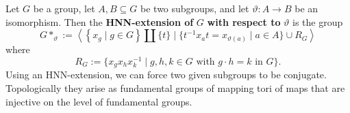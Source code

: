 \begin{definition}
    Let $G$ be a group, let $A,B \subseteq G$ be two subgroups, and let $\vartheta \colon A \to B$ be an isomorphism. Then the \textbf{HNN-extension of} $G$ \textbf{with respect to} $\vartheta$ is the group \[
        G * _{\vartheta} := \left\langle \left\{ x_g \mid g \in G \right\} \amalg \{t\} \mid  \{t ^{-1} x_a t = x _{\vartheta(a)}\mid a \in A\} \cup R_G  \right\rangle 
    \] where \[
    R_G := \{x_g x_h x_k ^{-1} \mid g,h ,k \in G \text{ with } g \cdot h =k \text{ in } G\} .
    \] Using an HNN-extension, we can force two given subgroups to be conjugate. Topologically they arise as fundamental groups of mapping tori of maps that are injective on the level of fundamental groups.
\end{definition}

